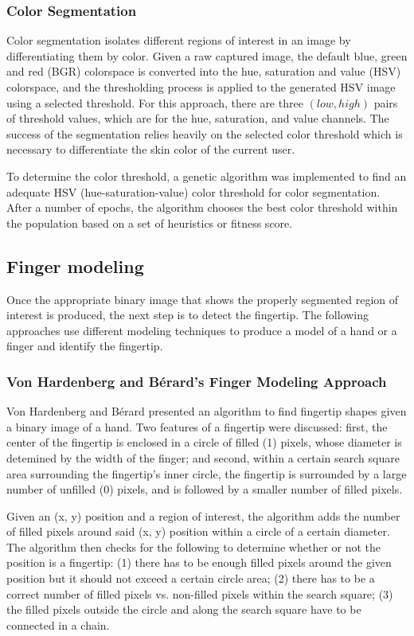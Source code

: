 \documentclass{acm_proc_article-sp}
\begin{document}
\subsubsection{Color Segmentation}
Color segmentation isolates different regions of interest in an image by differentiating them by color. Given a raw captured image, the default blue, green and red (BGR) colorspace is converted into the hue, saturation and value (HSV) colorspace, and the thresholding process is applied to the generated HSV image using a selected threshold. For this approach, there are three \( (low, high) \) pairs of threshold values, which are for the hue, saturation, and value channels. The success of the segmentation relies heavily on the selected color threshold which is necessary to differentiate the skin color of the current user. 

To determine the color threshold, a genetic algorithm was implemented to find an adequate HSV (hue-saturation-value) color threshold for color segmentation. After a number of epochs, the algorithm chooses the best color threshold within the population based on a set of heuristics or fitness score.

\subsection{Finger modeling}
Once the appropriate binary image that shows the properly segmented region of interest is produced, the next step is to detect the fingertip. The following approaches use different modeling techniques to produce a model of a hand or a finger and identify the fingertip.

\subsubsection{Von Hardenberg and B\'erard's Finger Modeling Approach}
Von Hardenberg and B\'erard\cite{Hardenberg:2001} presented an algorithm to find fingertip shapes given a binary image of a hand. Two features of a fingertip were discussed: first, the center of the fingertip is enclosed in a circle of filled (1) pixels, whose diameter is detemined by the width of the finger; and second, within a certain search square area surrounding the fingertip's inner circle, the fingertip is surrounded by a large number of unfilled (0) pixels, and is followed by a smaller number of filled pixels.

Given an (x, y) position and a region of interest, the algorithm adds the number of filled pixels around said (x, y) position within a circle of a certain diameter. The algorithm then checks for the following to determine whether or not the position is a fingertip: (1) there has to be enough filled pixels around the given position but it should not exceed a certain circle area; (2) there has to be a correct number of filled pixels vs. non-filled pixels within the search square; (3) the filled pixels outside the circle and along the search square have to be connected in a chain.
\end{document}
